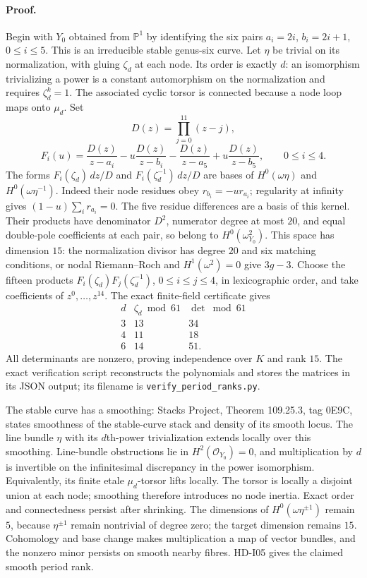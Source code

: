 \paragraph{Proof.}
Begin with $Y_0$ obtained from $\mathbb P^1$ by identifying the six
pairs $a_i=2i$, $b_i=2i+1$, $0\le i\le5$. This is an irreducible
stable genus-six curve. Let $\eta$ be trivial on its normalization,
with gluing $\zeta_d$ at each node. Its order is exactly $d$: an
isomorphism trivializing a power is a constant automorphism on the
normalization and requires $\zeta_d^k=1$. The associated cyclic
torsor is connected because a node loop maps onto $\mu_d$.
Set
\[
D(z)=\prod_{j=0}^{11}(z-j),
\]
\[
F_i(u)=\frac{D(z)}{z-a_i}-u\frac{D(z)}{z-b_i}
       -\frac{D(z)}{z-a_5}+u\frac{D(z)}{z-b_5},
\qquad 0\le i\le4.
\]
The forms $F_i(\zeta_d)\,dz/D$ and
$F_i(\zeta_d^{-1})\,dz/D$ are bases of
$H^0(\omega\eta)$ and $H^0(\omega\eta^{-1})$.
Indeed their node residues obey $r_{b_i}=-ur_{a_i}$; regularity at
infinity gives $(1-u)\sum_i r_{a_i}=0$. The five residue differences
are a basis of this kernel.
Their products have denominator $D^2$, numerator degree at most $20$,
and equal double-pole coefficients at each pair, so belong to
$H^0(\omega_{Y_0}^2)$. This space has dimension $15$: the normalization
divisor has degree $20$ and six matching conditions, or nodal
Riemann--Roch and $H^1(\omega^2)=0$ give $3g-3$.
Choose the fifteen products $F_i(\zeta_d)F_j(\zeta_d^{-1})$,
$0\le i\le j\le4$, in lexicographic order, and take coefficients of
$z^0,\ldots,z^{14}$. The exact finite-field certificate gives
\[
\begin{array}{c|c|c}
d&\zeta_d\bmod61&\det\bmod61\\\hline
3&13&34\\4&11&18\\6&14&51.
\end{array}
\]
All determinants are nonzero, proving independence over $K$ and rank
$15$. The exact verification script reconstructs the polynomials and
stores the matrices in its JSON output; its filename is
\texttt{verify\_\allowbreak period\_\allowbreak ranks.py}.

The stable curve has a smoothing: Stacks Project, Theorem 109.25.3,
tag 0E9C, states smoothness of the stable-curve stack and density of its
smooth locus. The line bundle $\eta$ with its $d$th-power trivialization
extends locally over this smoothing. Line-bundle obstructions lie in
$H^2(\mathcal O_{Y_0})=0$, and multiplication by $d$ is invertible on
the infinitesimal discrepancy in the power isomorphism. Equivalently,
its finite etale $\mu_d$-torsor lifts locally. The torsor is locally a
disjoint union at each node; smoothing therefore introduces no node
inertia. Exact order and connectedness persist after shrinking.
The dimensions of $H^0(\omega\eta^{\pm1})$ remain $5$, because
$\eta^{\pm1}$ remain nontrivial of degree zero; the target dimension
remains $15$. Cohomology and base change makes multiplication a map
of vector bundles, and the nonzero minor persists on smooth nearby
fibres. HD-I05 gives the claimed smooth period rank.

